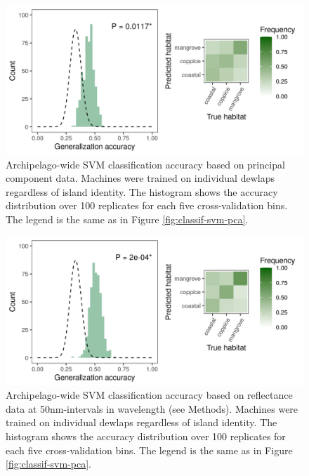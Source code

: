 \begin{figure}[H]
	\centering
	\includegraphics[width=\textwidth]{"../analyses/04-machine learning/plots/classif_svm_pca_pooled"}
	\caption{Archipelago-wide SVM classification accuracy based on principal component data. Machines were trained on individual dewlaps regardless of island identity. The histogram shows the accuracy distribution over 100 replicates for each five cross-validation bins. The legend is the same as in Figure \ref{fig:classif-svm-pca}.}
	\label{supfig:classif-svm-pca-pooled}
\end{figure}

\begin{figure}[H]
	\centering
	\includegraphics[width=\textwidth]{"../analyses/04-machine learning/plots/classif_svm_refl_pooled"}
	\caption{Archipelago-wide SVM classification accuracy based on reflectance data at 50nm-intervals in wavelength (see Methods). Machines were trained on individual dewlaps regardless of island identity. The histogram shows the accuracy distribution over 100 replicates for each five cross-validation bins. The legend is the same as in Figure \ref{fig:classif-svm-pca}.}
	\label{supfig:classif-svm-refl-pooled}
\end{figure}

